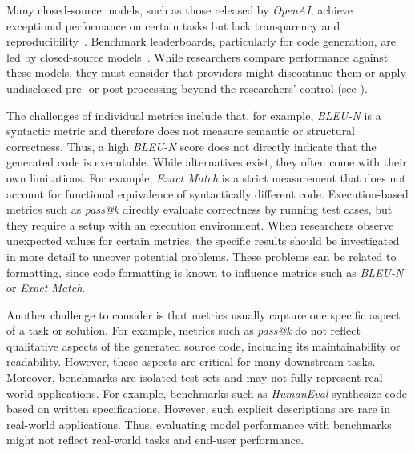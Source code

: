 Many closed-source models, such as those released by \emph{OpenAI}, achieve exceptional performance on certain tasks but lack transparency and reproducibility~\cite{DBLP:conf/nips/00110ZZDJLHL24, DBLP:journals/corr/abs-2308-01861, DBLP:journals/corr/abs-2406-15877}.
Benchmark leaderboards, particularly for code generation, are led by closed-source models~\cite{DBLP:journals/corr/abs-2308-01861, DBLP:journals/corr/abs-2406-15877}.
While researchers \should compare performance against these models, they must consider that providers might discontinue them or apply undisclosed pre- or post-processing beyond the researchers' control (see \openllm).

The challenges of individual metrics include that, for example, \emph{BLEU-N} is a syntactic metric and therefore does not measure semantic or structural correctness.
Thus, a high \emph{BLEU-N} score does not directly indicate that the generated code is executable.
While alternatives exist, they often come with their own limitations.
For example, \emph{Exact Match} is a strict measurement that does not account for functional equivalence of syntactically different code.
Execution-based metrics such as \emph{pass@k} directly evaluate correctness by running test cases, but they require a setup with an execution environment.
When researchers observe unexpected values for certain metrics, the specific results should be investigated in more detail to uncover potential problems.
These problems can be related to formatting, since code formatting is known to influence metrics such as \emph{BLEU-N} or \emph{Exact Match}.

Another challenge to consider is that metrics usually capture one specific aspect of a task or solution.
For example, metrics such as \emph{pass@k} do not reflect qualitative aspects of the generated source code, including its maintainability or readability.
However, these aspects are critical for many downstream tasks.
Moreover, benchmarks are isolated test sets and may not fully represent real-world applications.
For example, benchmarks such as \emph{HumanEval} synthesize code based on written specifications.
However, such explicit descriptions are rare in real-world applications.
Thus, evaluating model performance with benchmarks might not reflect real-world tasks and end-user performance.

